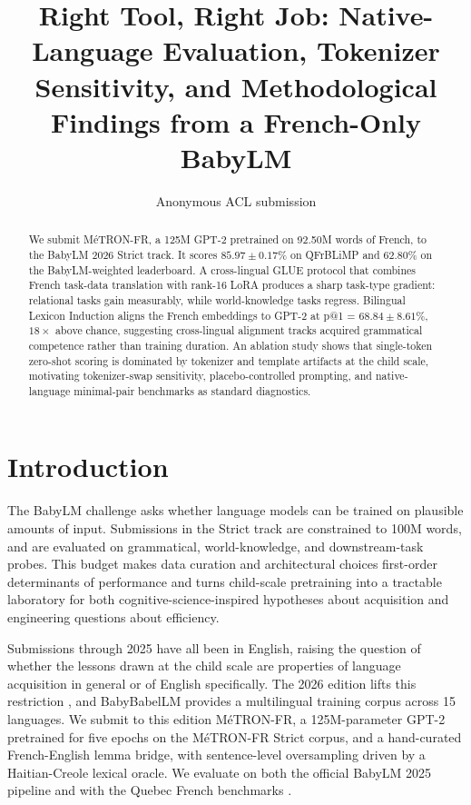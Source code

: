 \documentclass[11pt]{article}
\title{Right Tool, Right Job: Native-Language Evaluation, Tokenizer Sensitivity, and Methodological Findings from a French-Only BabyLM}
\author{Anonymous ACL submission}
\begin{document}
\maketitle

\begin{abstract}
We submit MéTRON-FR, a 125M GPT-2 pretrained on 92.50M words of French, to the BabyLM 2026 Strict track. It scores $85.97 \pm 0.17$\% on QFrBLiMP and $62.80$\% on the BabyLM-weighted leaderboard. 
A cross-lingual GLUE protocol that combines French task-data translation with rank-16 LoRA produces a sharp task-type gradient: relational tasks gain measurably, while world-knowledge tasks regress. Bilingual Lexicon Induction aligns the French embeddings to GPT-2 at p@1 = $68.84 \pm 8.61$\%, $18\times$ above chance, suggesting cross-lingual alignment tracks acquired grammatical competence rather than training duration. 
An ablation study shows that single-token zero-shot scoring is dominated by tokenizer and template artifacts at the child scale, motivating tokenizer-swap sensitivity, placebo-controlled prompting, and native-language minimal-pair benchmarks as standard diagnostics.
\end{abstract}

\section{Introduction}
\label{sec:intro}

The BabyLM challenge \citep{warstadt2023babylm,hu2024babylm,charpentier2025babylm} asks whether language models can be trained on plausible amounts of input. 
Submissions in the Strict track are constrained to 100M words, and are evaluated on grammatical, world-knowledge, and downstream-task probes. 
This budget makes data curation and architectural choices first-order determinants of performance and turns child-scale pretraining into a tractable laboratory for both cognitive-science-inspired hypotheses about acquisition and engineering questions about efficiency.

Submissions through 2025 have all been in English, raising the question of whether the lessons drawn at the child scale are properties of language acquisition in general or of English specifically. The 2026 edition lifts this restriction \citep{babylm2026cfp}, and BabyBabelLM \citep{jumelet2026babelm} provides a multilingual training corpus across 15 languages. 
We submit to this edition MéTRON-FR, a 125M-parameter GPT-2 pretrained for five epochs on the MéTRON-FR Strict corpus, and a hand-curated French-English lemma bridge, with sentence-level oversampling driven by a Haitian-Creole lexical oracle. 
We evaluate on both the official BabyLM 2025 pipeline and with the Quebec French benchmarks \citep{beauchemin2025qfrblimp,beauchemin2025qfrcola}.
\end{document}
